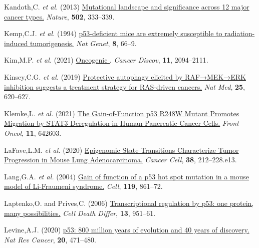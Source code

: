 \begin{CSLReferences}{1}{0}
\leavevmode{}%
Kandoth,C. \emph{et al.} (2013) \href{https://doi.org/10.1038/nature12634}{Mutational landscape and significance across 12 major cancer types.} \emph{Nature}, \textbf{502}, 333--339.

\leavevmode{}%
Kemp,C.J. \emph{et al.} (1994) \href{https://doi.org/10.1038/ng0994-66}{p53-deficient mice are extremely susceptible to radiation-induced tumorigenesis.} \emph{Nat Genet}, \textbf{8}, 66--9.

\leavevmode{}%
Kim,M.P. \emph{et al.} (2021) \href{https://doi.org/10.1158/2159-8290.cd-20-1228}{Oncogenic }. \emph{Cancer Discov}, \textbf{11}, 2094--2111.

\leavevmode{}%
Kinsey,C.G. \emph{et al.} (2019) \href{https://doi.org/10.1038/s41591-019-0367-9}{Protective autophagy elicited by RAF→MEK→ERK inhibition suggests a treatment strategy for RAS-driven cancers.} \emph{Nat Med}, \textbf{25}, 620--627.

\leavevmode{}%
Klemke,L. \emph{et al.} (2021) \href{https://doi.org/10.3389/fonc.2021.642603}{The Gain-of-Function p53 R248W Mutant Promotes Migration by STAT3 Deregulation in Human Pancreatic Cancer Cells.} \emph{Front Oncol}, \textbf{11}, 642603.

\leavevmode{}%
LaFave,L.M. \emph{et al.} (2020) \href{https://doi.org/10.1016/j.ccell.2020.06.006}{Epigenomic State Transitions Characterize Tumor Progression in Mouse Lung Adenocarcinoma.} \emph{Cancer Cell}, \textbf{38}, 212--228.e13.

\leavevmode{}%
Lang,G.A. \emph{et al.} (2004) \href{https://doi.org/10.1016/j.cell.2004.11.006}{Gain of function of a p53 hot spot mutation in a mouse model of Li-Fraumeni syndrome.} \emph{Cell}, \textbf{119}, 861--72.

\leavevmode{}%
Laptenko,O. and Prives,C. (2006) \href{https://doi.org/10.1038/sj.cdd.4401916}{Transcriptional regulation by p53: one protein, many possibilities.} \emph{Cell Death Differ}, \textbf{13}, 951--61.

\leavevmode{}%
Levine,A.J. (2020) \href{https://doi.org/10.1038/s41568-020-0262-1}{p53: 800 million years of evolution and 40 years of discovery.} \emph{Nat Rev Cancer}, \textbf{20}, 471--480.


\end{CSLReferences}
